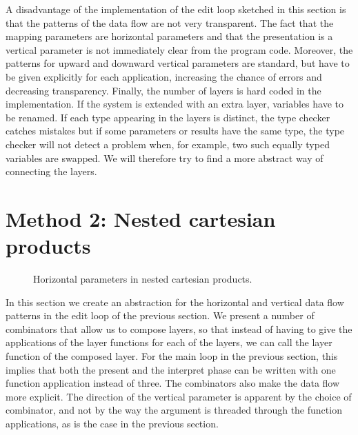 A disadvantage of the implementation of the edit loop sketched in this section is that the patterns of the data flow are not very transparent. The fact that the mapping parameters are horizontal parameters and that the presentation is a vertical parameter is not immediately clear from the program code. Moreover, the patterns for upward and downward vertical parameters are standard, but have to be given explicitly for each application, increasing the chance of errors and decreasing transparency. Finally, the number of layers is hard coded in the implementation. If the system is extended with an extra layer, variables have to be renamed. If each type appearing in the layers is distinct, the type checker catches mistakes but if some parameters or results have the same type, the type checker will not detect a problem when, for example, two such equally typed variables are swapped. We will therefore try to find a more abstract way of connecting the layers.


%																
%																
%																
\section{Method 2: Nested cartesian products}

\label{sectncp}
\begin{figure}
\begin{small}
\begin{center}
\begin{center}
\begin{scriptsize}
\end{scriptsize}
\end{center}\caption{ Horizontal parameters in nested cartesian products.}\label{ncp} 
\end{center}
\end{small}
\end{figure}

 In this section we create an abstraction for the horizontal and vertical data flow patterns in the edit loop of the previous section. We present a number of combinators that allow us to compose layers, so that instead of having to give the applications of the layer functions for each of the layers, we can call the layer function of the composed layer. For the main loop in the previous section, this implies that both the present and the interpret phase can be written with one function application instead of three. The combinators also make the data flow more explicit. The direction of the vertical parameter is apparent by the choice of combinator, and not by the way the argument is threaded through the function applications, as is the case in the previous section. 

